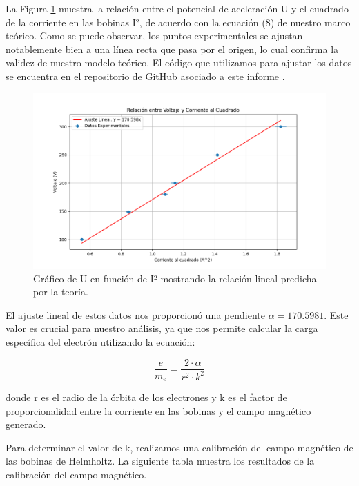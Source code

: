 \documentclass[twocolumn,a4paper,11pt]{scrartcl}
\begin{document}
La Figura \ref{fig:U_vs_I2} muestra la relación entre el potencial de aceleración U y el cuadrado de la corriente en las bobinas I², de acuerdo con la ecuación (8) de nuestro marco teórico. Como se puede observar, los puntos experimentales se ajustan notablemente bien a una línea recta que pasa por el origen, lo cual confirma la validez de nuestro modelo teórico. El código que utilizamos para ajustar los datos se encuentra en el repositorio de GitHub asociado a este informe \cite{leiva2025}.

\begin{figure}[h]
    \centering
    \includegraphics[width=1\linewidth]{voltaje_vs_corriente_cuadrado.png}
    \caption{Gráfico de U en función de I² mostrando la relación lineal predicha por la teoría.}
    \label{fig:U_vs_I2}
\end{figure}

El ajuste lineal de estos datos nos proporcionó una pendiente $\alpha = 170.5981$. Este valor es crucial para nuestro análisis, ya que nos permite calcular la carga específica del electrón utilizando la ecuación:

\begin{equation}
\frac{e}{m_e} = \frac{2 \cdot \alpha}{r^2 \cdot k^2}
\end{equation}

donde r es el radio de la órbita de los electrones y k es el factor de proporcionalidad entre la corriente en las bobinas y el campo magnético generado.

Para determinar el valor de k, realizamos una calibración del campo magnético de las bobinas de Helmholtz. 
La siguiente tabla muestra los resultados de la calibración del campo magnético.
\end{document}

